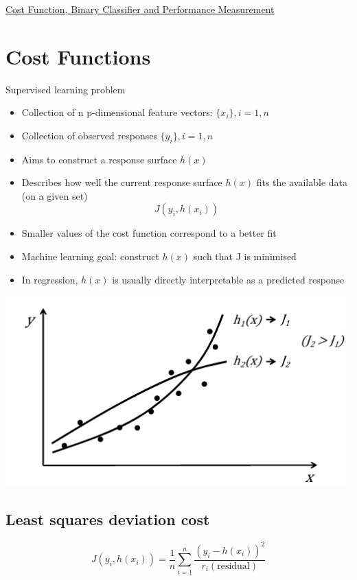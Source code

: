 \documentclass{article}[18pt]
\begin{document}
\begin{center}
\underline{\Large Cost Function, Binary Classifier and Performance Measurement}
\end{center}
\section{Cost Functions}
Supervised learning problem
\begin{itemize}
	\item Collection of n p-dimensional feature vectors: $\{x_i\}, i=1,n$
	\item Collection of observed responses $\{y_i\},i=1,n$
	\item Aims to construct a response surface $h(x)$
\end{itemize}
\begin{itemize}
	\item Describes how well the current response surface $h(x)$ fits the available data (on a given set)
	$$J(y_i,h(x_i))$$
	\item Smaller values of the cost function correspond to a better fit
	\item Machine learning goal: construct $h(x)$ such that J is minimised
	\item In regression, $h(x)$ is usually directly interpretable as a predicted response
\end{itemize}
\begin{center}
	\includegraphics[scale=0.7]{"Cost Function"}
\end{center}
\subsection{Least squares deviation cost}
$$J(y_i,h(x_i))=\dfrac{1}{n}\sum_{i=1}^{n}\dfrac{(y_i-h(x_i))^2}{r_i(\text{residual})}$$
\end{document}

